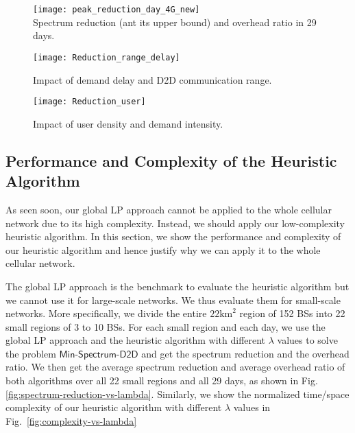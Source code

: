\begin{figure*}[t!]
\begin{minipage}[t]{0.3\linewidth}
  \centering
	\texttt{[image: peak\_reduction\_day\_4G\_new]}\\
	\caption{Spectrum reduction (ant its upper bound) and overhead ratio in 29 days.}\label{fig:spectrum-reduction_day}
\end{minipage}
\hfill
\begin{minipage}[t]{0.3\linewidth}
\centering
\texttt{[image: Reduction\_range\_delay]}
\caption{\label{fig:impact-of-delay}  Impact of demand delay and D2D communication range.}
\end{minipage}
\hfill
\begin{minipage}[t]{0.3\linewidth}
\centering
\texttt{[image: Reduction\_user]}
\caption{\label{fig:impact-of-users}  Impact of user density and demand intensity.}
\end{minipage}
\end{figure*}

\subsection{Performance and Complexity of the Heuristic Algorithm}
As seen soon, our global LP approach cannot be applied to the whole cellular network due to its high complexity.
Instead, we should apply our low-complexity heuristic algorithm. In this section, we
show the performance and complexity of our heuristic algorithm and
hence justify why we can apply it to the whole cellular network.

The global LP approach is the benchmark to evaluate the heuristic algorithm but
we cannot use it for large-scale networks. We thus evaluate
them for small-scale networks. More specifically,
we divide the entire $22\text{km}^2$ region of 152 BSs into 22 small regions of 3 to 10 BSs.
For each small region and each day,
we use the global LP approach and the heuristic algorithm with different $\lambda$ values
to solve the problem $\textsf{Min-Spectrum-D2D}$ and get the spectrum reduction and the overhead ratio.
We then get the average spectrum reduction and average overhead ratio of both algorithms over
all 22 small regions and all 29 days, as shown in Fig. \ref{fig:spectrum-reduction-vs-lambda}.
Similarly, we show the normalized time/space complexity of our heuristic algorithm with different $\lambda$ values
in Fig.~\ref{fig:complexity-vs-lambda}

